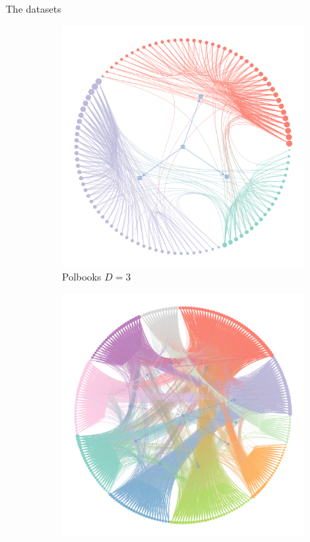 \documentclass{beamer}
\begin{document}
	\begin{frame}{The datasets}
		\begin{figure}[!h]
			\centering
			\begin{subfigure}[t]{0.3\linewidth}
				\centering
				\includegraphics[width=\linewidth]{polbooks-graph.png}
				\caption{Polbooks $D=3$}
				\label{fig:polbooks-graph}
			\end{subfigure}
			\hfill
			\begin{subfigure}[t]{0.3\linewidth}
				\centering
				\includegraphics[width=\linewidth]{school-graph.png}

\end{subfigure}
\end{figure}
\end{frame}
\end{document}

